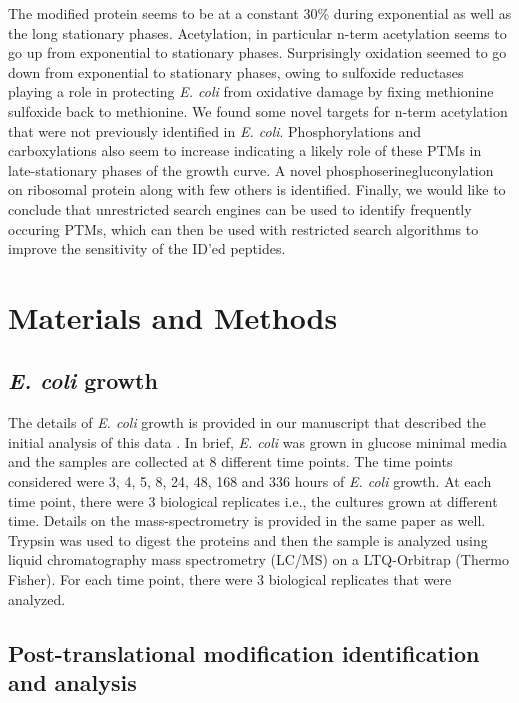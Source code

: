 \documentclass[12pt]{article}
\begin{document}
The modified protein seems to be at a constant 30\% during exponential as well as the long stationary phases. Acetylation, in particular n-term acetylation seems to go up from exponential to stationary phases. Surprisingly oxidation seemed to go down from exponential to stationary phases, owing to sulfoxide reductases playing a role in protecting \emph{E. coli} from oxidative damage by fixing methionine sulfoxide back to methionine. We found some novel targets for n-term acetylation that were not previously identified in \emph{E. coli}. Phosphorylations and carboxylations also seem to increase indicating a likely role of these PTMs in late-stationary phases of the growth curve. A novel phosphoserinegluconylation on ribosomal protein along with few others is identified. Finally, we would like to conclude that unrestricted search engines can be used to identify frequently occuring PTMs, which can then be used with restricted search algorithms to improve the sensitivity of the ID'ed peptides.


\section{Materials and Methods}

\subsection{\emph{E. coli} growth} 

The details of \emph{E. coli} growth is provided in our manuscript that described the initial analysis of this data \cite{Houseretal2015}. In brief, \emph{E. coli} was grown in glucose minimal media and the samples are collected at 8 different time points. The time points considered were 3, 4, 5, 8, 24, 48, 168 and 336 hours of \emph{E. coli} growth. At each time point, there were 3 biological replicates i.e., the cultures grown at different time. Details on the mass-spectrometry is provided in the same paper as well. Trypsin was used to digest the proteins and then the sample is analyzed using liquid chromatography mass spectrometry (LC/MS) on a LTQ-Orbitrap (Thermo Fisher). For each time point, there were 3 biological replicates that were analyzed.

\subsection{Post-translational modification identification and analysis} 
\end{document}
